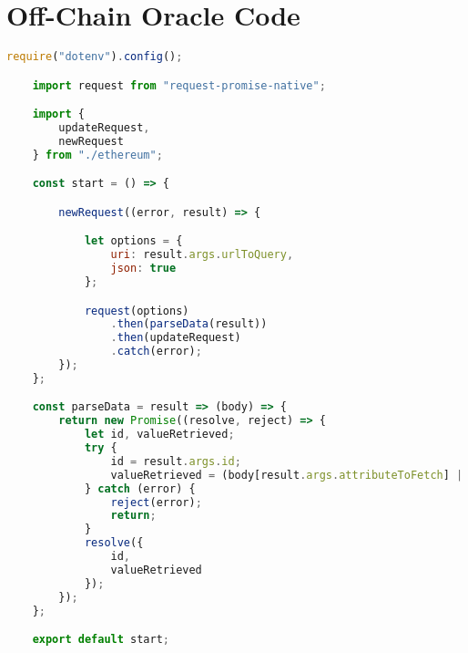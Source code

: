 \chapter{Off-Chain Oracle Code} \label{ap3:off-chain-oracle-code}

\begin{lstlisting}[language=JavaScript]
    require("dotenv").config();

    import request from "request-promise-native";

    import {
        updateRequest,
        newRequest
    } from "./ethereum";

    const start = () => {

        newRequest((error, result) => {

            let options = {
                uri: result.args.urlToQuery,
                json: true
            };

            request(options)
                .then(parseData(result))
                .then(updateRequest)
                .catch(error);
        });
    };

    const parseData = result => (body) => {
        return new Promise((resolve, reject) => {
            let id, valueRetrieved;
            try {
                id = result.args.id;
                valueRetrieved = (body[result.args.attributeToFetch] || 0).toString();
            } catch (error) {
                reject(error);
                return;
            }
            resolve({
                id,
                valueRetrieved
            });
        });
    };

    export default start;
\end{lstlisting}